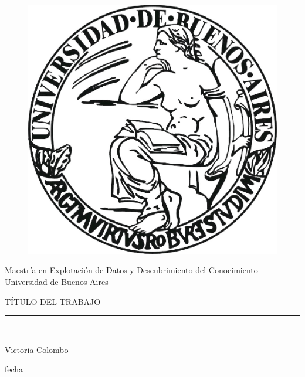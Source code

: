 \documentclass[10pt, spanish]{article}
\begin{document}
\printlength\textwidth
\begin{titlepage}

\begin{center}
\vspace*{-0.5in}
\begin{figure}[htb]
\begin{center}
\includegraphics[scale=.3]{imagenes/uba2.jpg}
\end{center}
\end{figure}

\begin{large}
Maestría en Explotación de Datos y Descubrimiento del Conocimiento\\
\vspace*{0.15in}
Universidad de Buenos Aires \\

\vspace*{0.6in}
\end{large}

\begin{large}
TÍTULO DEL TRABAJO\\


\end{large}
\vspace*{0.2in}
\vspace*{0.3in}


\vspace*{0.3in}
\rule{80mm}{0.1mm}\\
\vspace*{0.1in}
\begin{large}
Victoria Colombo

\vspace*{0.3in}

\vspace*{0.1in}fecha
\end{large}
\end{center}

\end{titlepage}
\end{document}
